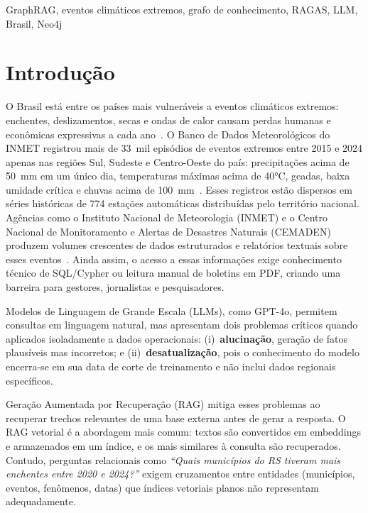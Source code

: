 \documentclass[conference]{IEEEtran}
\begin{document}
\begin{IEEEkeywords}
GraphRAG, eventos climáticos extremos, grafo de conhecimento,
RAGAS, LLM, Brasil, Neo4j
\end{IEEEkeywords}

\section{Introdução}

O Brasil está entre os países mais vulneráveis a eventos climáticos
extremos: enchentes, deslizamentos, secas e ondas de calor causam
perdas humanas e econômicas expressivas a cada ano~\cite{atkins2024generative}.
O Banco de Dados Meteorológicos do INMET registrou mais de
33~mil episódios de eventos extremos entre 2015 e 2024 apenas nas
regiões Sul, Sudeste e Centro-Oeste do país: precipitações
acima de 50~mm em um único dia, temperaturas máximas acima de 40°C,
geadas, baixa umidade crítica e chuvas acima de 100~mm~\cite{inmet2024dados}.
Esses registros estão dispersos em séries históricas de 774
estações automáticas distribuídas pelo território nacional.
Agências como o Instituto Nacional de Meteorologia (INMET) e o
Centro Nacional de Monitoramento e Alertas de Desastres Naturais
(CEMADEN) produzem volumes crescentes de dados estruturados e
relatórios textuais sobre esses eventos~\cite{cemaden2024boletins}.
Ainda assim, o acesso a essas informações exige conhecimento
técnico de SQL/Cypher ou leitura manual de boletins em PDF,
criando uma barreira para gestores, jornalistas e pesquisadores.

Modelos de Linguagem de Grande Escala (LLMs), como GPT-4o,
permitem consultas em linguagem natural, mas apresentam dois
problemas críticos quando aplicados isoladamente a dados
operacionais: (i)~\textbf{alucinação}, geração de fatos
plausíveis mas incorretos; e (ii)~\textbf{desatualização},
pois o conhecimento do modelo encerra-se em sua data de corte
de treinamento e não inclui dados regionais específicos.

Geração Aumentada por Recuperação (RAG) mitiga esses problemas
ao recuperar trechos relevantes de uma base externa antes de
gerar a resposta.
O RAG vetorial é a abordagem mais comum: textos são convertidos em
embeddings e armazenados em um índice, e os mais similares à consulta
são recuperados.
Contudo, perguntas relacionais como \emph{``Quais municípios do RS
tiveram mais enchentes entre 2020 e 2024?''} exigem cruzamentos
entre entidades (municípios, eventos, fenômenos, datas) que índices
vetoriais planos não representam adequadamente.
\end{document}
